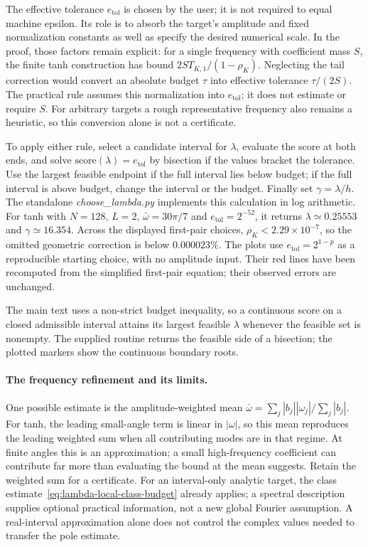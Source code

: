 \documentclass[11pt]{article}
\begin{document}
The effective tolerance $e_{\mathrm{tol}}$ is chosen by the user; it is not
required to equal machine epsilon. Its role is to absorb the target's
amplitude and fixed normalization constants as well as specify the desired
numerical scale. In the proof, those factors remain explicit: for a
single frequency with coefficient mass $S$, the finite tanh construction
has bound $2S T_{K,1}/(1-\rho_K)$. Neglecting the tail correction would
convert an absolute budget $\tau$ into effective tolerance $\tau/(2S)$.
The practical rule assumes this normalization into $e_{\mathrm{tol}}$;
it does not estimate or require $S$. For arbitrary targets a rough
representative frequency also remains a heuristic, so this conversion
alone is not a certificate.

To apply either rule, select a candidate interval for $\lambda$, evaluate
the score at both ends, and solve $\text{score}(\lambda)=e_{\mathrm{tol}}$
by bisection if the values bracket the tolerance. Use the largest feasible
endpoint if the full interval lies below budget; if the full interval is
above budget, change the interval or the budget. Finally set
$\gamma=\lambda/h$. The standalone \emph{choose\_lambda.py} implements
this calculation in log arithmetic. For tanh with $N=128$, $L=2$,
$\bar\omega=30\pi/7$ and $e_{\mathrm{tol}}=2^{-52}$, it returns
$\lambda\simeq0.25553$ and $\gamma\simeq16.354$.
Across the displayed first-pair choices, $\rho_K<2.29\times10^{-7}$, so the omitted geometric correction is below $0.000023\%$.
The plots use $e_{\mathrm{tol}}=2^{1-p}$ as a reproducible starting
choice, with no amplitude input. Their red lines have been recomputed
from the simplified first-pair equation; their observed errors are unchanged.

The main text uses a non-strict budget inequality, so a continuous
score on a closed admissible interval attains its largest feasible
$\lambda$ whenever the feasible set is nonempty. The supplied routine
returns the feasible side of a bisection; the plotted markers show the
continuous boundary roots.

\paragraph{The frequency refinement and its limits.}
One possible estimate is the amplitude-weighted mean
$\bar\omega=\sum_j|b_j||\omega_j|/\sum_j|b_j|$.
For tanh, the leading small-angle term is linear in $|\omega|$, so this mean reproduces the leading weighted sum when all contributing modes are in that regime. At finite angles this is an approximation; a small high-frequency coefficient can contribute
far more than evaluating the bound at the mean suggests. Retain the
weighted sum for a certificate. For an interval-only analytic target,
the class estimate~\eqref{eq:lambda-local-class-budget} already applies;
a spectral description supplies optional practical information, not a new
global Fourier assumption. A real-interval approximation alone does not
control the complex values needed to transfer the pole estimate.
\end{document}
